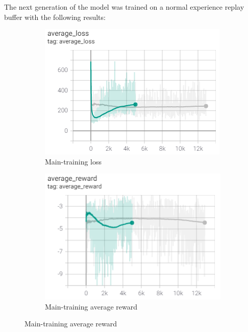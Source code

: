 The next generation of the model was trained on a normal experience replay buffer with the following results:

\begin{figure}[ht]
	\centering
	\begin{subfigure}[b]{0.49\textwidth}
		\centering
		\includegraphics[width=\textwidth]{figures/training2-main-loss-smooth.PNG}
		\caption{Main-training loss}
		\label{fig:main-loss-smoothed-2}
	\end{subfigure}
	\hfill
	\begin{subfigure}[b]{0.49\textwidth}
		\centering
		\includegraphics[width=\textwidth]{figures/training2-main-reward-smooth.PNG}
		\caption{Main-training average reward}
		\label{fig:main-reward-smoothed-2}
	\end{subfigure}
\end{figure}

